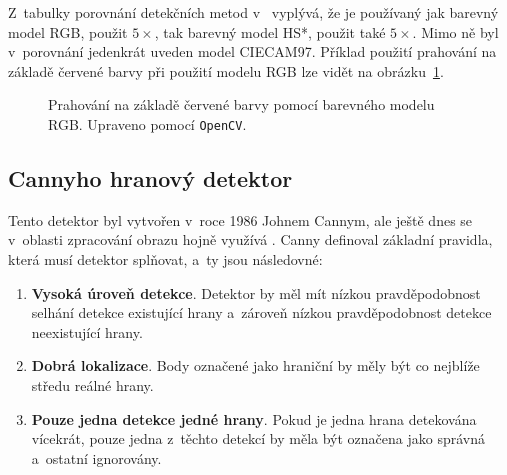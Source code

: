 Z~tabulky porovnání detekčních metod v~\cite{tsDetectOverview} vyplývá, že je používaný jak barevný model RGB, použit $5\times$, tak barevný model HS*, použit také $5\times$. Mimo ně byl v~porovnání jedenkrát uveden model CIECAM97. Příklad použití prahování na základě červené barvy při použití modelu RGB lze vidět na obrázku~\ref{fig:prahovani}.

\begin{figure}[H]
    \centering
    \hfill
    \caption{Prahování na základě červené barvy pomocí barevného modelu RGB. Upraveno pomocí \texttt{OpenCV}.}
    \label{fig:prahovani}
\end{figure}


\subsection*{Cannyho hranový detektor}
\label{zpusobyDetekceCanny}
Tento detektor byl vytvořen v~roce 1986 Johnem Cannym, ale ještě dnes se v~oblasti zpracování obrazu hojně využívá \cite{canny}. Canny definoval základní pravidla, která musí detektor splňovat, a~ty jsou následovné:

\begin{enumerate}
    \item \textbf{Vysoká úroveň detekce}. Detektor by měl mít nízkou pravděpodobnost selhání detekce existující hrany a~zároveň nízkou pravděpodobnost detekce neexistující hrany.
    \item \textbf{Dobrá lokalizace}. Body označené jako hraniční by měly být co nejblíže středu reálné hrany.
    \item \textbf{Pouze jedna detekce jedné hrany}. Pokud je jedna hrana detekována vícekrát, pouze jedna z~těchto detekcí by měla být označena jako správná a~ostatní ignorovány.
\end{enumerate}

